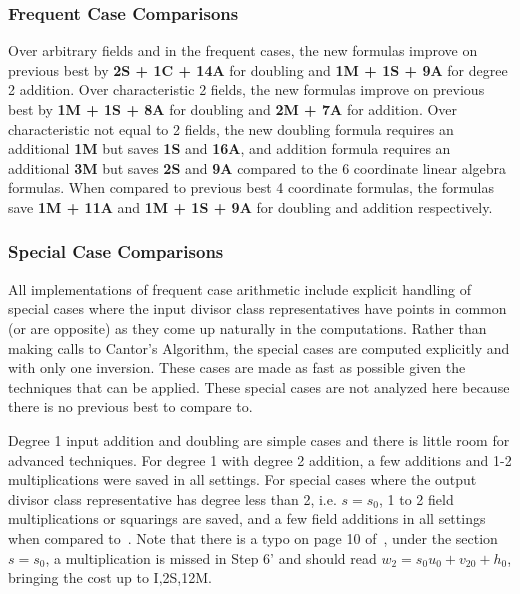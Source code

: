 \subsubsection{Frequent Case Comparisons}
Over arbitrary fields and in the frequent cases, the new formulas improve on
previous best by \textbf{2S + 1C + 14A} for doubling and \textbf{1M + 1S + 9A}
for degree 2 addition. Over characteristic 2 fields, the new formulas improve on
previous best by \textbf{1M + 1S + 8A} for doubling and \textbf{2M + 7A} for
addition. Over characteristic not equal to 2 fields, the new doubling formula
requires an additional \textbf{1M} but saves \textbf{1S} and \textbf{16A}, and
addition formula requires an additional \textbf{3M} but saves \textbf{2S} and
\textbf{9A} compared to the 6 coordinate linear algebra formulas. When compared
to previous best 4 coordinate formulas, the formulas save \textbf{1M + 11A} and
\textbf{1M + 1S + 9A} for doubling and addition respectively. 

\subsubsection{Special Case Comparisons}
All implementations of frequent case arithmetic include explicit handling of
special cases where the input divisor class representatives have points in
common (or are opposite) as they come up naturally in the computations. Rather
than making calls to Cantor's Algorithm, the special cases are computed
explicitly and with only one inversion. These cases are made as fast as possible
given the techniques that can be applied. These special cases are not analyzed
here because there is no previous best to compare to.

Degree 1 input addition and doubling are simple cases and there is little room
for advanced techniques. For degree 1 with degree 2 addition, a few additions
and 1-2 multiplications were saved in all settings. For special cases where the
output divisor class representative has degree less than 2, i.e. $s = s_0$, 1
to 2 field multiplications or squarings are saved, and a few field additions in
all settings when compared to~\cite{Lange_explicit_2005}. Note that there is a
typo on page 10 of~\cite{Lange_explicit_2005}, under the section $s = s_0$, a
multiplication is missed in Step 6' and should read $w_2 = s_0u_0 + v_{20} +
h_0$, bringing the cost up to I,2S,12M.








